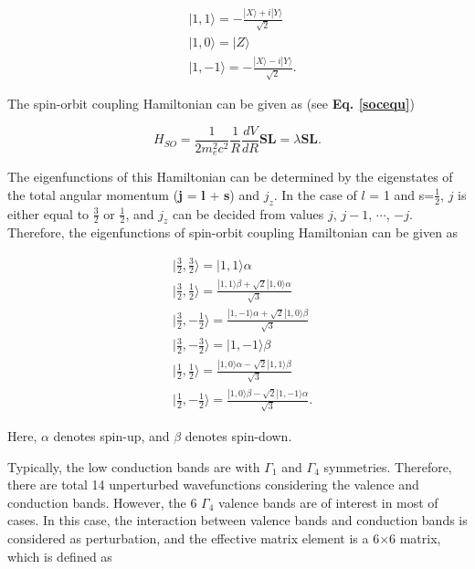 \documentclass[a4paper, 12pt, titlepage,oneside,drop]{kthesis}
\begin{document}
\begin{equation}\begin{split}\label{77}
& | 1, 1 \rangle = - \frac{|X\rangle+i|Y\rangle}{\sqrt{2}} \\
& | 1, 0 \rangle =  |Z\rangle \\
& | 1, -1 \rangle = - \frac{|X\rangle-i|Y\rangle}{\sqrt{2}}.
\end{split}
\end{equation}

The spin-orbit coupling Hamiltonian can be given as (see \textbf{Eq. \ref{socequ}})

\begin{equation}\label{88}
H_{SO}=\frac{1}{2 m_e^2 c^2} \frac{1}{R} \frac{dV}{dR}\textbf{S}\textbf{L} = \lambda \textbf{S}\textbf{L}.
\end{equation}

The eigenfunctions of this Hamiltonian can be determined by the eigenstates of the total angular momentum (\textbf{j} = \textbf{l} + \textbf{s}) and $j_z$. In the case of $l$ = 1 and s=$\frac{1}{2}$,  $j$ is either equal
to $\frac{3}{2}$ or $\frac{1}{2}$, and $j_z$ can be decided from values $j$, $j-1$, $\cdots$, $-j$. Therefore, the eigenfunctions of spin-orbit coupling Hamiltonian can be given as 

\begin{equation}\begin{split}\label{99}
& \Big| \frac{3}{2}, \frac{3}{2} \Big\rangle = |1,1\rangle \alpha \\
& \Big| \frac{3}{2}, \frac{1}{2} \Big\rangle = \frac{|1,1\rangle \beta + \sqrt{2} |1,0\rangle\alpha}{\sqrt{3}} \\
& \Big| \frac{3}{2}, -\frac{1}{2} \Big\rangle = \frac{|1,-1\rangle \alpha + \sqrt{2} |1,0\rangle\beta}{\sqrt{3}} \\
& \Big| \frac{3}{2}, -\frac{3}{2} \Big\rangle = |1,-1\rangle \beta \\
& \Big| \frac{1}{2}, \frac{1}{2} \Big\rangle = \frac{|1,0\rangle \alpha - \sqrt{2} |1,1\rangle\beta}{\sqrt{3}} \\
& \Big| \frac{1}{2}, -\frac{1}{2} \Big\rangle = \frac{|1,0\rangle \beta - \sqrt{2} |1,-1\rangle\alpha}{\sqrt{3}}. 
\end{split}
\end{equation}


Here, $\alpha$ denotes spin-up, and $\beta$ denotes spin-down.

Typically, the low conduction bands are with $\varGamma_1$ and $\varGamma_4$ symmetries. Therefore, there are total 14 unperturbed wavefunctions considering the valence and conduction bands. However, the 6 $\varGamma_4$ valence bands are of 
interest in most of cases. In this case, the interaction between valence bands and conduction bands is considered as perturbation, and the effective matrix element is a 6$\times$6 matrix, which is defined as
\end{document}

